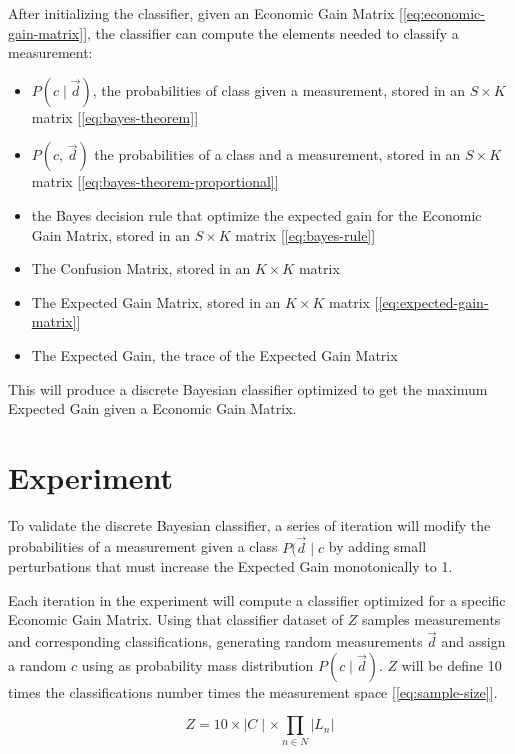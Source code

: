 \documentclass[letterpaper, conference]{IEEEtran}
\begin{document}
After initializing the classifier, given an Economic Gain Matrix [\ref{eq:economic-gain-matrix}], the classifier can compute the elements needed to classify a measurement:

\begin{itemize}
  \item $P(c \mid \vec{d})$, the probabilities of class given a measurement, stored in an $S \times K$ matrix [\ref{eq:bayes-theorem}]
  \item $P(c,\, \vec{d})$ the probabilities of a class and a measurement, stored in an $S \times K$ matrix [\ref{eq:bayes-theorem-proportional}]
  \item the Bayes decision rule that optimize the expected gain for the Economic Gain Matrix, stored in an $S \times K$ matrix [\ref{eq:bayes-rule}]
  \item The Confusion Matrix, stored in an $K \times K$ matrix
  \item The Expected Gain Matrix, stored in an $K \times K$ matrix [\ref{eq:expected-gain-matrix}]
  \item The Expected Gain, the trace of the Expected Gain Matrix
\end{itemize}

This will produce a discrete Bayesian classifier optimized to get the maximum Expected Gain given a Economic Gain Matrix.

\section{Experiment}

To validate the discrete Bayesian classifier, a series of iteration will modify the probabilities of a measurement given a class $P(\vec{d} \mid c$ by adding small perturbations that must increase the Expected Gain monotonically to 1.

Each iteration in the experiment will compute a classifier optimized for a specific Economic Gain Matrix. Using that classifier dataset of $Z$ samples measurements and corresponding classifications, generating random measurements $\vec{d}$ and assign a random $c$ using as probability mass distribution $P(c \mid \vec{d})$. $Z$ will be define 10 times the classifications number times the measurement space [\ref{eq:sample-size}].

\begin{equation}\label{eq:sample-size}
  Z = 10 \times \mid C \mid \times \prod_{n \in N} |L_n|
\end{equation}
\end{document}
